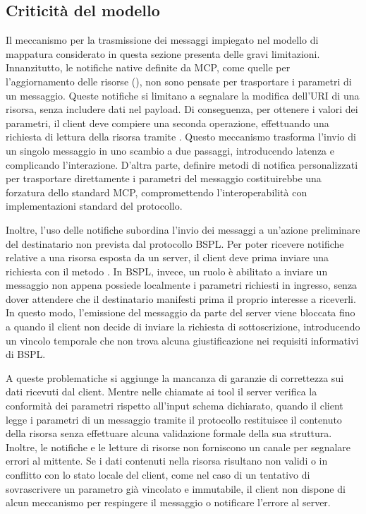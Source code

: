 \subsection{Criticità del modello}\label{disgiunta-valutazione}

Il meccanismo per la trasmissione dei messaggi impiegato nel modello di mappatura considerato in questa sezione presenta delle gravi limitazioni. Innanzitutto, le notifiche native definite da MCP, come quelle per l'aggiornamento delle risorse (), non sono pensate per trasportare i parametri di un messaggio. Queste notifiche si limitano a segnalare la modifica dell'URI di una risorsa, senza includere dati nel payload. Di conseguenza, per ottenere i valori dei parametri, il client deve compiere una seconda operazione, effettuando una richiesta di lettura della risorsa tramite . Questo meccanismo trasforma l'invio di un singolo messaggio in uno scambio a due passaggi, introducendo latenza e complicando l'interazione. D'altra parte, definire metodi di notifica personalizzati per trasportare direttamente i parametri del messaggio costituirebbe una forzatura dello standard MCP, compromettendo l'interoperabilità con implementazioni standard del protocollo.

Inoltre, l'uso delle notifiche subordina l'invio dei messaggi a un'azione preliminare del destinatario non prevista dal protocollo BSPL. Per poter ricevere notifiche relative a una risorsa esposta da un server, il client deve prima inviare una richiesta con il metodo . In BSPL, invece, un ruolo è abilitato a inviare un messaggio non appena possiede localmente i parametri richiesti in ingresso, senza dover attendere che il destinatario manifesti prima il proprio interesse a riceverli. In questo modo, l'emissione del messaggio da parte del server viene bloccata fino a quando il client non decide di inviare la richiesta di sottoscrizione, introducendo un vincolo temporale che non trova alcuna giustificazione nei requisiti informativi di BSPL.

A queste problematiche si aggiunge la mancanza di garanzie di correttezza sui dati ricevuti dal client. Mentre nelle chiamate ai tool il server verifica la conformità dei parametri rispetto all'input schema dichiarato, quando il client legge i parametri di un messaggio tramite  il protocollo restituisce il contenuto della risorsa senza effettuare alcuna validazione formale della sua struttura. Inoltre, le notifiche e le letture di risorse non forniscono un canale per segnalare errori al mittente. Se i dati contenuti nella risorsa risultano non validi o in conflitto con lo stato locale del client, come nel caso di un tentativo di sovrascrivere un parametro già vincolato e immutabile, il client non dispone di alcun meccanismo per respingere il messaggio o notificare l'errore al server.

